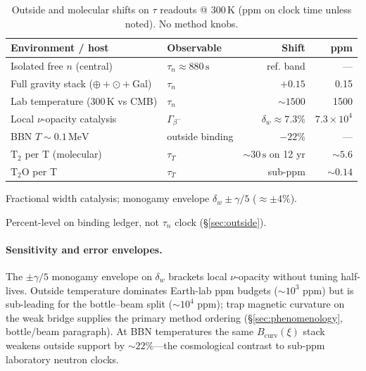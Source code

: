 \documentclass[11pt,notitlepage]{amsart}
\begin{document}
\begin{table}[h]
\centering
\caption{Outside and molecular shifts on $\tau$ readouts @ $300\,\mathrm{K}$ (ppm on
clock time unless noted). No method knobs.}
\label{tab:environment-shifts}
\begin{threeparttable}
\begin{tabular}{@{}llrr@{}}
\toprule
Environment / host & Observable & Shift & ppm \\
\midrule
Isolated free $n$ (central) & $\tau_n\approx 880\,\mathrm{s}$ & ref. band & --- \\
Full gravity stack ($\oplus+\odot+$Gal) & $\tau_n$ & $+0.15$ & 0.15 \\
Lab temperature ($300\,\mathrm{K}$ vs CMB) & $\tau_n$ & $\sim 1500$ & 1500 \\
Local $\nu$-opacity catalysis & $\Gamma_{\beta^-}$ & $\delta_w\approx 7.3\%$ & $7.3\times 10^4$\tnote{a} \\
BBN $T\sim 0.1\,\mathrm{MeV}$ & outside binding & $-22\%$ & ---\tnote{b} \\
$\mathrm{T_2}$ per T (molecular) & $\tau_T$ & $\sim 30\,\mathrm{s}$ on 12 yr & $\sim 5.6$ \\
$\mathrm{T_2O}$ per T & $\tau_T$ & sub-ppm & $\sim 0.14$ \\
\bottomrule
\end{tabular}
\begin{tablenotes}\small
\item[a] Fractional width catalysis; monogamy envelope $\delta_w\pm\gamma/5$ ($\approx\pm 4\%$).
\item[b] Percent-level on binding ledger, not $\tau_n$ clock (\S\ref{sec:outside}).
\end{tablenotes}
\end{threeparttable}
\end{table}

\paragraph{Sensitivity and error envelopes.}
The $\pm\gamma/5$ monogamy envelope on $\delta_w$ brackets local $\nu$-opacity without
tuning half-lives. Outside temperature dominates Earth-lab ppm budgets ($\sim 10^3$ ppm)
but is sub-leading for the bottle--beam split ($\sim 10^4$ ppm); trap magnetic curvature
on the weak bridge supplies the primary method ordering
(\S\ref{sec:phenomenology}, bottle/beam paragraph). At BBN temperatures the same
$B_{\mathrm{curv}}(\xi)$ stack weakens outside support by $\sim 22\%$---the cosmological
contrast to sub-ppm laboratory neutron clocks.
\end{document}
